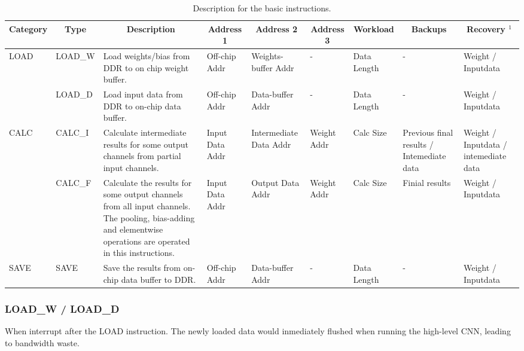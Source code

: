\begin{table}[t]
	\centering
	\caption{Description for the basic instructions.}
\begin{tabular}{|p{2.7em}|p{3.4em}|p{12.3em}|p{4.2em}|p{4.6em}|p{4.2em}|p{4.2em}||p{4.2em}|p{4.2em}|}
	\hline
	\multicolumn{1}{|c|}{Category} & \multicolumn{1}{c|}{Type} & \multicolumn{1}{c|}{Description} & \multicolumn{1}{c|}{Address 1} & \multicolumn{1}{c|}{Address 2} & \multicolumn{1}{c|}{Address 3} & \multicolumn{1}{c||}{Workload} & \multicolumn{1}{c|}{Backups} & \multicolumn{1}{c|}{Recovery $^1$} \bigstrut\\
	\hline
	\multirow{2}[4]{*}{LOAD} & LOAD\_W & Load weights/bias from DDR to on chip weight buffer. & Off-chip Addr & Weights-buffer Addr & -     & Data  Length & -     & Weight / Inputdata \bigstrut\\
	\cline{2-9}\multicolumn{1}{|c|}{} & LOAD\_D & Load input data from DDR to on-chip data buffer. & Off-chip Addr & Data-buffer Addr & -     & Data  Length & -     & Weight / Inputdata \bigstrut\\
	\hline
	\multirow{2}[4]{*}{CALC} & CALC\_I & Calculate intermediate results for some output channels from partial  input channels. & Input  Data Addr & Intermediate Data Addr & Weight Addr & Calc Size & Previous final results / Intemediate data  & Weight / Inputdata /  intemediate data \bigstrut\\
	\cline{2-9}\multicolumn{1}{|c|}{} & CALC\_F & Calculate the results for some output channels from all input channels. The pooling, bias-adding and elementwise operations are operated in this instructions. & Input  Data Addr & Output  Data Addr & Weight Addr & Calc Size & Finial results & Weight / Inputdata \bigstrut\\
	\hline
	SAVE  & SAVE  & Save the results from on-chip data buffer to DDR. & Off-chip Addr & Data-buffer Addr & -     & Data  Length & -     & Weight / Inputdata \bigstrut\\
	\hline
	\end{tabular}%
	
	\label{tab:instr}%
  \end{table}%


\subsubsection{LOAD\_W / LOAD\_D }
When interrupt after the LOAD instruction. The newly loaded data would inmediately flushed when running the high-level CNN, leading to bandwidth waste.


